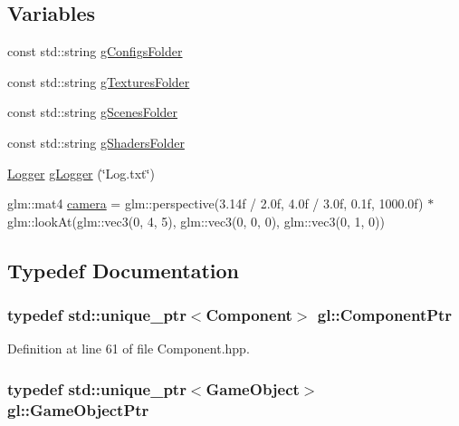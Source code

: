 \subsection*{Variables}
\begin{DoxyCompactItemize}
\item 
const std\-::string \hyperlink{namespacegl_aafe9d24eae03ed5746915f9eca31a8a7}{g\-Configs\-Folder}
\item 
const std\-::string \hyperlink{namespacegl_a29b4d4caadd5b8410c596cc8400a97fa}{g\-Textures\-Folder}
\item 
const std\-::string \hyperlink{namespacegl_a0d856c0557484a919d502684cd99757f}{g\-Scenes\-Folder}
\item 
const std\-::string \hyperlink{namespacegl_a093da90108ad18db03ecd26baa2cf69f}{g\-Shaders\-Folder}
\item 
\hyperlink{classgl_1_1_logger}{Logger} \hyperlink{namespacegl_a55370b885058f1d6b99e298bc7bc722d}{g\-Logger} (\char`\"{}Log.\-txt\char`\"{})
\item 
glm\-::mat4 \hyperlink{namespacegl_a5580e107f8adbdc0f887df19caebb589}{camera} = glm\-::perspective(3.\-14f / 2.\-0f, 4.\-0f / 3.\-0f, 0.\-1f, 1000.\-0f) $\ast$ glm\-::look\-At(glm\-::vec3(0, 4, 5), glm\-::vec3(0, 0, 0), glm\-::vec3(0, 1, 0))
\end{DoxyCompactItemize}


\subsection{Typedef Documentation}
\hypertarget{namespacegl_a2cd59688c30d8f0b1168a93aa4bffbcc}{
\subsubsection[{Component\-Ptr}]{\setlength{\rightskip}{0pt plus 5cm}typedef std\-::unique\-\_\-ptr$<${\bf Component}$>$ {\bf gl\-::\-Component\-Ptr}}}\label{namespacegl_a2cd59688c30d8f0b1168a93aa4bffbcc}


Definition at line 61 of file Component.\-hpp.

\hypertarget{namespacegl_a4caed01d7776fc4f8768dbf8d88d0388}{
\subsubsection[{Game\-Object\-Ptr}]{\setlength{\rightskip}{0pt plus 5cm}typedef std\-::unique\-\_\-ptr$<${\bf Game\-Object}$>$ {\bf gl\-::\-Game\-Object\-Ptr}}}\label{namespacegl_a4caed01d7776fc4f8768dbf8d88d0388}


